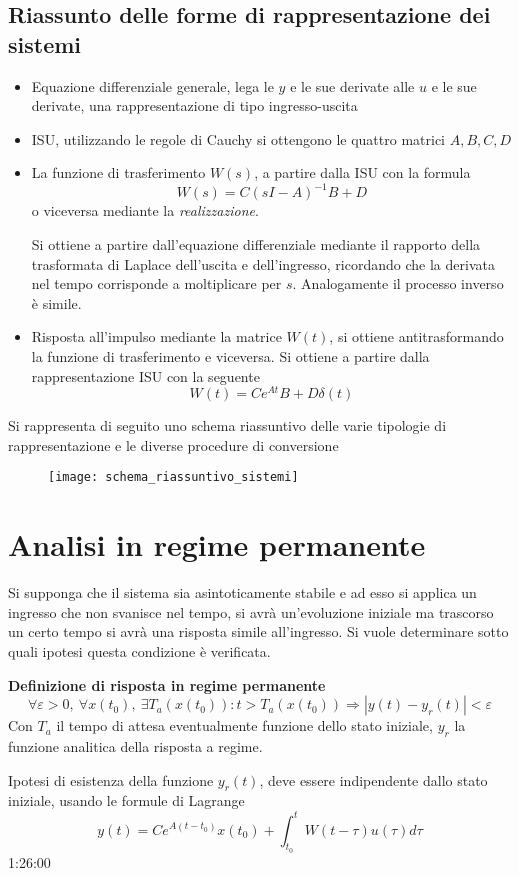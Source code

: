 \newpage
\section{Riassunto delle forme di rappresentazione dei sistemi}
\begin{itemize}
\item Equazione differenziale generale, lega le $y$ e le sue derivate alle $u$
e le sue derivate, una rappresentazione di tipo ingresso-uscita
\item ISU, utilizzando le regole di Cauchy si ottengono le quattro matrici
$A,B,C,D$
\item La funzione di trasferimento $W(s)$, a partire dalla ISU con la formula
$$
W(s) = C(sI-A)^{-1}B + D
$$
o viceversa mediante la \textit{realizzazione}.

Si ottiene a partire dall'equazione differenziale mediante il rapporto della
trasformata di Laplace dell'uscita e dell'ingresso, ricordando che la derivata
nel tempo corrisponde a moltiplicare per $s$.
Analogamente il processo inverso è simile.

\item Risposta all'impulso mediante la matrice $W(t)$, si ottiene
antitrasformando la funzione di trasferimento e viceversa.
Si ottiene a partire dalla rappresentazione ISU con la seguente
$$
W(t) = Ce^{At}B +D\delta(t)
$$
\end{itemize}

Si rappresenta di seguito uno schema riassuntivo delle varie tipologie di
rappresentazione e le diverse procedure di conversione
\begin{figure}[h]
\centering
\texttt{[image: schema\_riassuntivo\_sistemi]}
\end{figure}


\chapter{Analisi in regime permanente}
Si supponga che il sistema sia asintoticamente stabile e ad esso si applica un
ingresso che non svanisce nel tempo, si avrà un'evoluzione iniziale ma
trascorso un certo tempo si avrà una risposta simile all'ingresso.
Si vuole determinare sotto quali ipotesi questa condizione è verificata.

\textbf{Definizione di risposta in regime permanente}
$$
\forall \varepsilon>0 ,\ \forall x(t_0),\
\exists T_a\left(x(t_0)\right): t>T_a\left(x(t_0)\right)
\Rightarrow |y(t)-y_r(t)| < \varepsilon
$$
Con $T_a$ il tempo di attesa eventualmente funzione dello stato iniziale, $y_r$
la funzione analitica della risposta a regime.

Ipotesi di esistenza della funzione $y_r(t)$, deve essere indipendente dallo
stato iniziale, usando le formule di Lagrange
$$
y(t) = Ce^{A(t-t_0)}x(t_0)+\int_{t_0}^t
W(t-\tau)u(\tau)d\tau
$$
1:26:00
